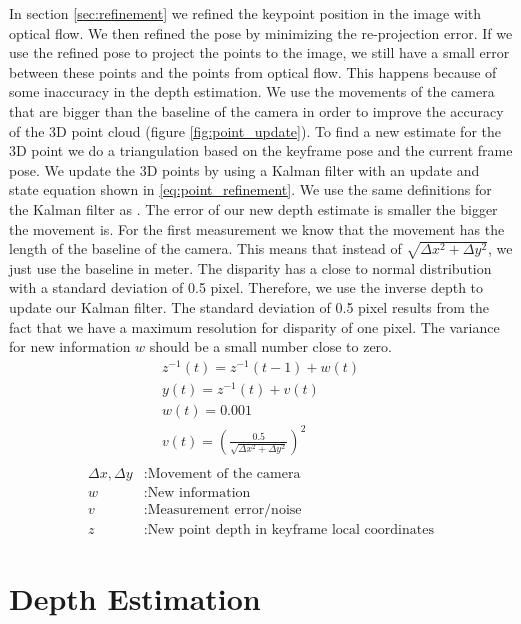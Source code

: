 \documentclass[11pt,a4paper,titlepage,oneside]{report}
\begin{document}
In section \ref{sec:refinement} we refined the keypoint position in the image with optical flow. We then refined the pose by minimizing the re-projection error. If we use the refined pose to project the points to the image, we still have a small error between these points and the points from optical flow. This happens because of some inaccuracy in the depth estimation. We use the movements of the camera that are bigger than the baseline of the camera in order to improve the accuracy of the 3D point cloud (figure \ref{fig:point_update}). To find a new estimate for the 3D point we do a triangulation \cite{rvc} based on the keyframe pose and the current frame pose. We update the 3D points by using a Kalman filter with an update and state equation shown in \ref{eq:point_refinement}. We use the same definitions for the Kalman filter as \cite{statdig}. The error of our new depth estimate is smaller the bigger the movement is. For the first measurement we know that the movement has the length of the baseline of the camera. This means that instead of $\sqrt{\Delta x^2+\Delta y^2}$, we just use the baseline in meter. The disparity has a close to normal distribution with a standard deviation of 0.5 pixel. Therefore, we use the inverse depth to update our Kalman filter. The standard deviation of 0.5 pixel results from the fact that we have a maximum resolution for disparity of one pixel. The variance for new information $w$ should be a small number close to zero.
\begin{equation}\label{eq:point_refinement}
  \begin{gathered}
    z^{-1}(t)=z^{-1}(t-1)+w(t)\\
    y(t)=z^{-1}(t)+v(t)\\
    w(t)=0.001\\
    v(t)=(\frac{0.5}{\sqrt{\Delta x^2 + \Delta y^2}})^2\\
  \end{gathered}
\end{equation}
\begin{align*}
  \Delta x, \Delta y  &: \text{Movement of the camera}\\
  w                   &: \text{New information}\\
  v                   &: \text{Measurement error/noise}\\
  z                   &: \text{New point depth in keyframe local coordinates}
\end{align*}

\chapter{Depth Estimation}\label{ch:depth}
\end{document}
